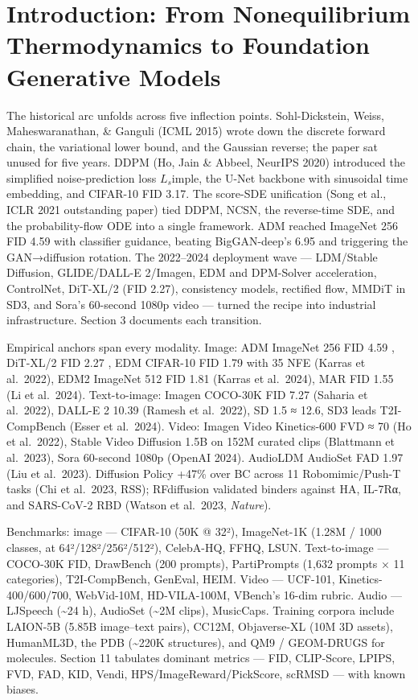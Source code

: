 \documentclass{article}
\begin{document}
\section{Introduction: From Nonequilibrium Thermodynamics to Foundation Generative Models}\label{introduction-from-nonequilibrium-thermodynamics-to-foundation-generative-models}

The historical arc unfolds across five inflection points. Sohl-Dickstein, Weiss, Maheswaranathan, \& Ganguli (ICML 2015) wrote down the discrete forward chain, the variational lower bound, and the Gaussian reverse; the paper sat unused for five years. DDPM (Ho, Jain \& Abbeel, NeurIPS 2020) introduced the simplified noise-prediction loss \(L_s\)imple, the U-Net backbone with sinusoidal time embedding, and CIFAR-10 FID 3.17. The score-SDE unification (Song et al., ICLR 2021 outstanding paper) tied DDPM, NCSN, the reverse-time SDE, and the probability-flow ODE into a single framework. ADM \citep{dhariwal2021diffusionmodelsbea} reached ImageNet 256 FID 4.59 with classifier guidance, beating BigGAN-deep's 6.95 and triggering the GAN→diffusion rotation. The 2022--2024 deployment wave --- LDM/Stable Diffusion, GLIDE/DALL-E 2/Imagen, EDM and DPM-Solver acceleration, ControlNet, DiT-XL/2 (FID 2.27), consistency models, rectified flow, MMDiT in SD3, and Sora's 60-second 1080p video --- turned the recipe into industrial infrastructure. Section 3 documents each transition.

Empirical anchors span every modality. Image: ADM ImageNet 256 FID 4.59 \citep{dhariwal2021diffusionmodelsbea}, DiT-XL/2 FID 2.27 \citep{peebles2023scalablediffusionm}, EDM CIFAR-10 FID 1.79 with 35 NFE (Karras et al.~2022), EDM2 ImageNet 512 FID 1.81 (Karras et al.~2024), MAR FID 1.55 (Li et al.~2024). Text-to-image: Imagen COCO-30K FID 7.27 (Saharia et al.~2022), DALL-E 2 10.39 (Ramesh et al.~2022), SD 1.5 ≈ 12.6, SD3 leads T2I-CompBench (Esser et al.~2024). Video: Imagen Video Kinetics-600 FVD ≈ 70 (Ho et al.~2022), Stable Video Diffusion 1.5B on 152M curated clips (Blattmann et al.~2023), Sora 60-second 1080p (OpenAI 2024). AudioLDM AudioSet FAD 1.97 (Liu et al.~2023). Diffusion Policy +47\% over BC across 11 Robomimic/Push-T tasks (Chi et al.~2023, RSS); RFdiffusion validated binders against HA, IL-7Rα, and SARS-CoV-2 RBD (Watson et al.~2023, \emph{Nature}).

Benchmarks: image --- CIFAR-10 (50K @ 32²), ImageNet-1K (1.28M / 1000 classes, at 64²/128²/256²/512²), CelebA-HQ, FFHQ, LSUN. Text-to-image --- COCO-30K FID, DrawBench (200 prompts), PartiPrompts (1,632 prompts × 11 categories), T2I-CompBench, GenEval, HEIM. Video --- UCF-101, Kinetics-400/600/700, WebVid-10M, HD-VILA-100M, VBench's 16-dim rubric. Audio --- LJSpeech (\textasciitilde24 h), AudioSet (\textasciitilde2M clips), MusicCaps. Training corpora include LAION-5B (5.85B image--text pairs), CC12M, Objaverse-XL (10M 3D assets), HumanML3D, the PDB (\textasciitilde220K structures), and QM9 / GEOM-DRUGS for molecules. Section 11 tabulates dominant metrics --- FID, CLIP-Score, LPIPS, FVD, FAD, KID, Vendi, HPS/ImageReward/PickScore, scRMSD --- with known biases.
\end{document}
